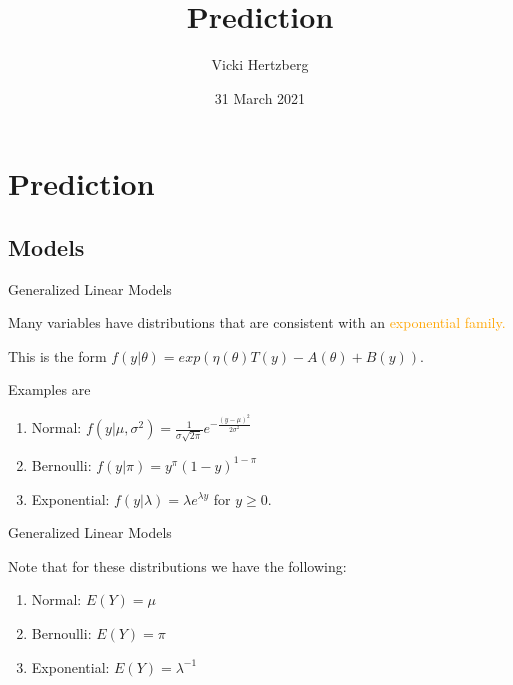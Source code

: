 \documentclass[
  12pt,
  ignorenonframetext,
]{beamer}
\title{Prediction}
\author{Vicki Hertzberg}
\date{31 March 2021}
\providecommand{\tightlist}{%
  \setlength{\itemsep}{0pt}\setlength{\parskip}{0pt}}
\begin{document}
\frame{\titlepage}

\begin{frame}
  \tableofcontents[hideallsubsections]
\end{frame}
\hypertarget{prediction}{%
\section{Prediction}\label{prediction}}

\hypertarget{models}{%
\subsection{Models}\label{models}}

\begin{frame}{Generalized Linear Models}
\protect\hypertarget{generalized-linear-models}{}

Many variables have distributions that are consistent with an
\textcolor{orange}{exponential family.}

\bigskip This is the form
\(f(y|\theta) = exp(\eta(\theta)T(y) - A(\theta) + B(y))\).

Examples are

\begin{enumerate}[<+->]
\tightlist
\item
  Normal:
  \(f(y|\mu, \sigma^2) = \frac{1}{\sigma \sqrt{2\pi}}e^{-\frac{(y-\mu)^2}{2\sigma^2}}\)
\item
  Bernoulli: \(f(y|\pi) = y^{\pi}(1-y)^{1-\pi}\)
\item
  Exponential: \(f(y|\lambda) = \lambda e^{\lambda y}\) for \(y \ge 0.\)
\end{enumerate}

\end{frame}

\begin{frame}{Generalized Linear Models}
\protect\hypertarget{generalized-linear-models-1}{}

Note that for these distributions we have the following:

\begin{enumerate}[<+->]
\tightlist
\item
  Normal: \(E(Y) = \mu\)
\item
  Bernoulli: \(E(Y) = \pi\)
\item
  Exponential: \(E(Y)=\lambda^{-1}\)
\end{enumerate}

\end{frame}
\end{document}
